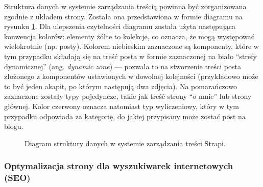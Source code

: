 \documentclass[12pt]{article}
\numberwithin{figure}{section}
\begin{document}
\begin{sloppypar}
Struktura danych w systemie zarządzania treścią powinna być zorganizowana zgodnie z układem strony. Została ona przedstawiona w formie diagramu na rysunku \ref{fig:diagram-typu-tresci.png}. Dla ulepszenia czytelności diagramu została użyta następująca konwencja kolorów: elementy żółte to kolekcje, co oznacza, że mogą występować wielokrotnie (np. posty). Kolorem niebieskim zaznaczone są komponenty, które w tym przypadku składają się na treść posta w formie zaznaczonej na biało ``strefy dynamicznej'' (ang. \textit{dynamic zone}) --- pozwala to na stworzenie treści posta złożonego z komponentów ustawionych w dowolnej kolejności (przykładowo może to być jeden akapit, po którym następują dwa zdjęcia). Na pomarańczowo zaznaczone zostały typy pojedyncze, takie jak treść strony ``o mnie'' lub strony głównej. Kolor czerwony oznacza natomiast typ wyliczeniowy, który w tym przypadku odpowiada za kategorię, do jakiej przypisany może zostać post na blogu.

\begin{figure}[H] 
    \centering
   \caption{Diagram struktury danych w systemie zarządzania treści Strapi.}
   \label{fig:diagram-typu-tresci.png}
\end{figure}

\subsubsection*{Optymalizacja strony dla wyszukiwarek internetowych (SEO)}


\end{sloppypar}
\end{document}

